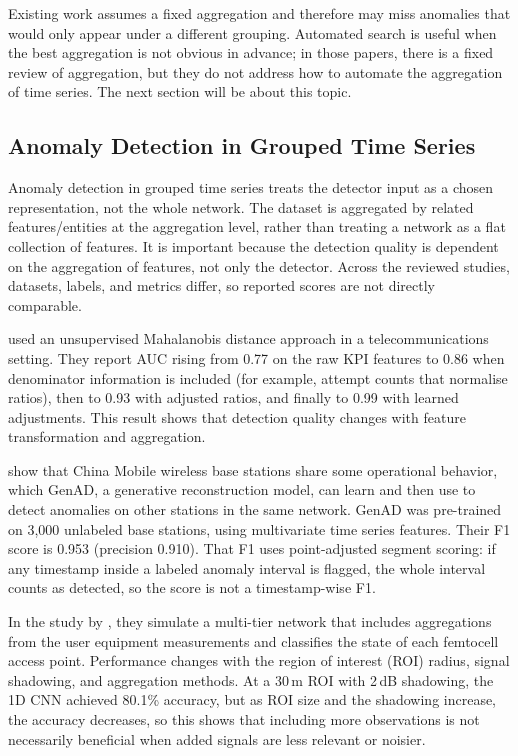 Existing work assumes a fixed aggregation and therefore may miss anomalies that would only appear under a different grouping.
Automated search is useful when the best aggregation is not obvious in advance; in those papers, there is a fixed review of aggregation, but they do not address how to automate the aggregation of time series.
The next section will be about this topic.

\subsection{Anomaly Detection in Grouped Time Series}

Anomaly detection in grouped time series treats the detector input as a chosen representation, not the whole network.
The dataset is aggregated by related features/entities at the aggregation level, rather than treating a network as a flat collection of features.
It is important because the detection quality is dependent on the aggregation of features, not only the detector.
Across the reviewed studies, datasets, labels, and metrics differ, so reported scores are not directly comparable.

\textcite{mefleh2025beyond} used an unsupervised Mahalanobis distance approach in a telecommunications setting.
They report \ac{AUC} rising from 0.77 on the raw \ac{KPI} features to 0.86 when denominator information is included (for example, attempt counts that normalise ratios), then to 0.93 with adjusted ratios, and finally to 0.99 with learned adjustments.
This result shows that detection quality changes with feature transformation and aggregation.

\textcite{hua2022genad} show that China Mobile wireless base stations share some operational behavior, which GenAD, a generative reconstruction model, can learn and then use to detect anomalies on other stations in the same network.
GenAD was pre-trained on 3{,}000 unlabeled base stations, using multivariate time series features.
Their F1 score is 0.953 (precision 0.910).
That F1 uses point-adjusted segment scoring: if any timestamp inside a labeled anomaly interval is flagged, the whole interval counts as detected, so the score is not a timestamp-wise F1.

In the study by \textcite{oguz2022anomaly}, they simulate a multi-tier network that includes aggregations from the user equipment measurements and classifies the state of each femtocell access point.
Performance changes with the region of interest (\ac{ROI}) radius, signal shadowing, and aggregation methods.
At a 30\,m \ac{ROI} with 2\,dB shadowing, the 1D \ac{CNN} achieved 80.1\% accuracy, but as \ac{ROI} size and the shadowing increase, the accuracy decreases, so this shows that including more observations is not necessarily beneficial when added signals are less relevant or noisier.

